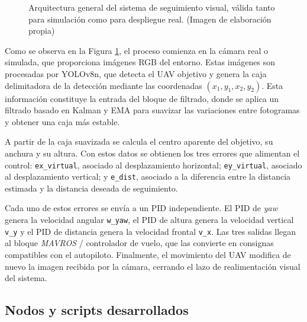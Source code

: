 \begin{figure}[H]
{%
    }
    \caption{Arquitectura general del sistema de seguimiento visual, válida tanto para simulación como para despliegue real. (Imagen de elaboración propia)}
    \label{fig:arquitectura_nodos}
\end{figure}

Como se observa en la Figura \ref{fig:arquitectura_nodos}, el proceso comienza en la cámara real o simulada, que proporciona imágenes RGB del entorno. Estas imágenes son procesadas por YOLOv8n, que detecta el UAV objetivo y genera la caja delimitadora de la detección mediante las coordenadas $(x_1,y_1,x_2,y_2)$. Esta información constituye la entrada del bloque de filtrado, donde se aplica un filtrado basado en Kalman y EMA para suavizar las variaciones entre fotogramas y obtener una caja más estable.

\vspace{0.3cm}

A partir de la caja suavizada se calcula el centro aparente del objetivo, su anchura y su altura. Con estos datos se obtienen los tres errores que alimentan el control: \texttt{ex\_virtual}, asociado al desplazamiento horizontal; \texttt{ey\_virtual}, asociado al desplazamiento vertical; y \texttt{e\_dist}, asociado a la diferencia entre la distancia estimada y la distancia deseada de seguimiento.

\vspace{0.3cm}

Cada uno de estos errores se envía a un PID independiente. El PID de \textit{yaw} genera la velocidad angular \texttt{w\_yaw}, el PID de altura genera la velocidad vertical \texttt{v\_y} y el PID de distancia genera la velocidad frontal \texttt{v\_x}. Las tres salidas llegan al bloque \textit{MAVROS} / controlador de vuelo, que las convierte en consignas compatibles con el autopiloto. Finalmente, el movimiento del UAV modifica de nuevo la imagen recibida por la cámara, cerrando el lazo de realimentación visual del sistema.

\subsection{Nodos y scripts desarrollados}

